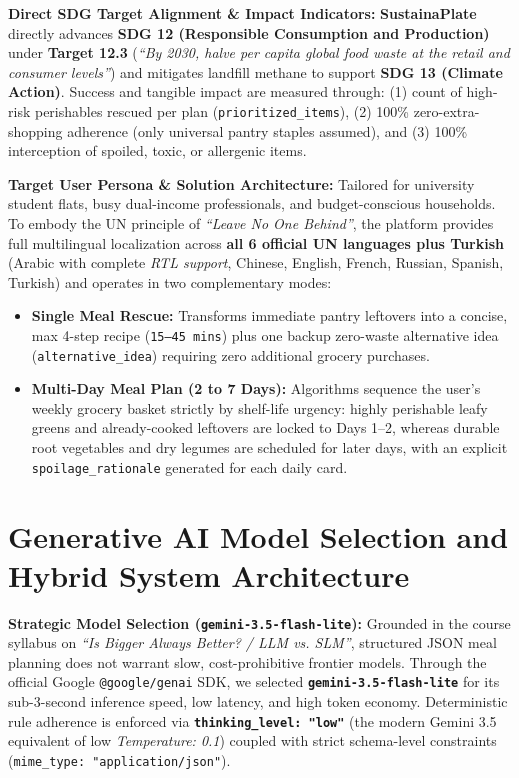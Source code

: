 \documentclass[9pt,a4paper]{article}
\begin{document}
\textbf{Direct SDG Target Alignment \& Impact Indicators:} \textbf{SustainaPlate} directly advances \textbf{SDG 12 (Responsible Consumption and Production)} under \textbf{Target 12.3} (\emph{``By 2030, halve per capita global food waste at the retail and consumer levels''}) and mitigates landfill methane to support \textbf{SDG 13 (Climate Action)}. Success and tangible impact are measured through: (1) count of high-risk perishables rescued per plan (\texttt{prioritized\_items}), (2) 100\% zero-extra-shopping adherence (only universal pantry staples assumed), and (3) 100\% interception of spoiled, toxic, or allergenic items.

\textbf{Target User Persona \& Solution Architecture:} Tailored for university student flats, busy dual-income professionals, and budget-conscious households. To embody the UN principle of \emph{``Leave No One Behind''}, the platform provides full multilingual localization across \textbf{all 6 official UN languages plus Turkish} (Arabic with complete \emph{RTL support}, Chinese, English, French, Russian, Spanish, Turkish) and operates in two complementary modes:
\begin{itemize}
  \item \textbf{Single Meal Rescue:} Transforms immediate pantry leftovers into a concise, max 4-step recipe (\texttt{15--45 mins}) plus one backup zero-waste alternative idea (\texttt{alternative\_idea}) requiring zero additional grocery purchases.
  \item \textbf{Multi-Day Meal Plan (2 to 7 Days):} Algorithms sequence the user's weekly grocery basket strictly by shelf-life urgency: highly perishable leafy greens and already-cooked leftovers are locked to Days 1--2, whereas durable root vegetables and dry legumes are scheduled for later days, with an explicit \texttt{spoilage\_rationale} generated for each daily card.
\end{itemize}

\section{Generative AI Model Selection and Hybrid System Architecture}
\textbf{Strategic Model Selection (\texttt{gemini-3.5-flash-lite}):} Grounded in the course syllabus on \emph{``Is Bigger Always Better? / LLM vs. SLM''}, structured JSON meal planning does not warrant slow, cost-prohibitive frontier models. Through the official Google \texttt{@google/genai} SDK, we selected \textbf{\texttt{gemini-3.5-flash-lite}} for its sub-3-second inference speed, low latency, and high token economy. Deterministic rule adherence is enforced via \textbf{\texttt{thinking\_level: "low"}} (the modern Gemini 3.5 equivalent of low \emph{Temperature: 0.1}) coupled with strict schema-level constraints (\texttt{mime\_type: "application/json"}).
\end{document}
